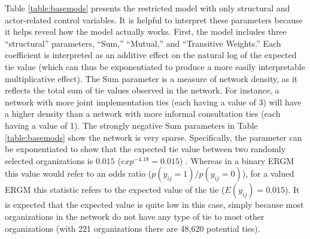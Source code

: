 \documentclass[12pt,a4paper,titlepage]{article}
\begin{document}
Table \ref{table:basemods} presents the restricted model with only structural and actor-related control variables. It is helpful to interpret these parameters because it helps reveal how the model actually works. First, the model includes three “structural” parameters, “Sum,” “Mutual,” and “Transitive Weights.”  Each coefficient is interpreted as an additive effect on the natural log of the expected tie value (which can thus be exponentiated to produce a more easily interpretable multiplicative effect). The Sum parameter is a measure of network density, as it reflects the total sum of tie values observed in the network. For instance, a network with more joint implementation ties (each having a value of 3) will have a higher density than a network with more informal consultation ties (each having a value of 1). The strongly negative Sum parameters in Table \ref{table:basemods} show the network is very sparse. Specifically, the parameter can be exponentiated to show that the expected tie value between two randomly selected organizations is $0.015$ ($exp^{-4.18} = 0.015$) \parencite{krivitsky2012}. Whereas in a binary ERGM this value would refer to an odds ratio ($p(y_{ij}=1) / p(y_{ij}=0)$), for a valued ERGM this statistic refers to the expected value of the tie ($E(y_{ij})=0.015$). It is expected that the expected value is quite low in this case, simply because most organizations in the network do not have any type of tie to most other organizations (with 221 organizations there are 48,620 potential ties).

\singlespacing

\doublespacing
\end{document}
